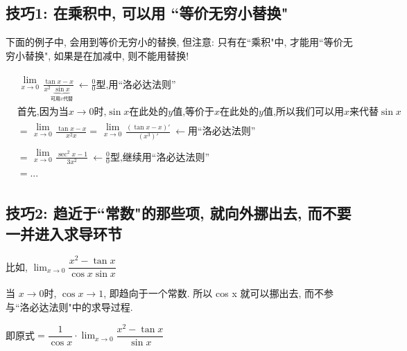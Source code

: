 \documentclass[UTF8]{ctexart}
\begin{document}
\subsection{技巧1: 在乘积中, 可以用 ``等价无穷小替换"}

下面的例子中, 会用到等价无穷小的替换, 但注意: 只有在``乘积"中, 才能用``等价无穷小替换", 如果是在加减中, 则不能用替换!

\begin{tcolorbox}[title = {例},boxrule={0.1em},colframe={black!10}, colback={black!3},colbacktitle={black!10},coltitle={black}]
\begin{align*}  %
&	\begin{matrix}
	\lim_{x\rightarrow 0}\\
\end{matrix}\frac{\tan x-x}{x^2\underset{\text{可用}x\text{代替}}{\underbrace{\sin x}}}\ \gets \frac{0}{0}\text{型,用}\text{洛必达法则}\\
&\text{首先,因为当}x\rightarrow 0\text{时,}\sin x\text{在此处的}y\text{值,等价于}x\text{在此处的}y\text{值,所以我们可以用}x\text{来代替}\sin x\\
&=\begin{matrix}
	\lim_{x\rightarrow 0}\\
\end{matrix}\frac{\tan x-x}{x^2x}=\begin{matrix}
	\lim_{x\rightarrow 0}\\
\end{matrix}\frac{\left( \tan x-x \right) '}{\left( x^3 \right) '}\ \gets \text{用}\text{洛必达法则}\\
&=\begin{matrix}
	\lim_{x\rightarrow 0}\\
\end{matrix}\frac{\sec ^2x-1}{3x^2}\ \gets \frac{0}{0}\text{型,继续用}\text{洛必达法则}\\
&=...\\
\end{align*}
\end{tcolorbox}




\subsection{技巧2: 趋近于``常数"的那些项, 就向外挪出去, 而不要一并进入求导环节}


\begin{tcolorbox}[title = {例},boxrule={0.1em},colframe={black!10}, colback={black!3},colbacktitle={black!10},coltitle={black}]
比如, $ \lim_{x\rightarrow 0} \dfrac{x^2-\tan x}{\cos x\sin x}$

当 $x \to 0$时,  $\cos x \to 1$, 即趋向于一个常数. 所以 cos x 就可以挪出去, 而不参与``洛必达法则"中的求导过程.

即原式$=\dfrac{1}{\cos x}\cdot \lim_{x\rightarrow 0} \dfrac{x^2-\tan x}{\sin x} $
\end{tcolorbox}
\end{document}
